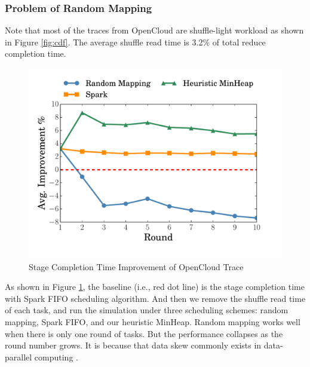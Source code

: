 \subsubsection{Problem of Random Mapping}\label{randomassign}
Note that most of the traces from OpenCloud are shuffle-light workload as shown in Figure \ref{fig:cdf}. 
The average shuffle read time is 3.2\% of total reduce completion time.
\begin{figure}
	\centering
	\includegraphics[width=0.6\linewidth]{fig/sim}
	\caption{Stage Completion Time Improvement of OpenCloud Trace}
	\label{fig:sim}
	\vspace{-1em}
\end{figure}
As shown in Figure \ref{fig:sim}, the baseline (i.e., red dot line) is the stage completion time with Spark FIFO scheduling algorithm. 
And then we remove the shuffle read time of each task, and run the simulation under three scheduling schemes: random mapping, Spark FIFO, and our heuristic MinHeap.
Random mapping works well when there is only one round of tasks. 
But the performance collapses as the round number grows. 
It is because that data skew commonly exists in data-parallel computing \cite{skewtune, reining, gufler2012load}. 

